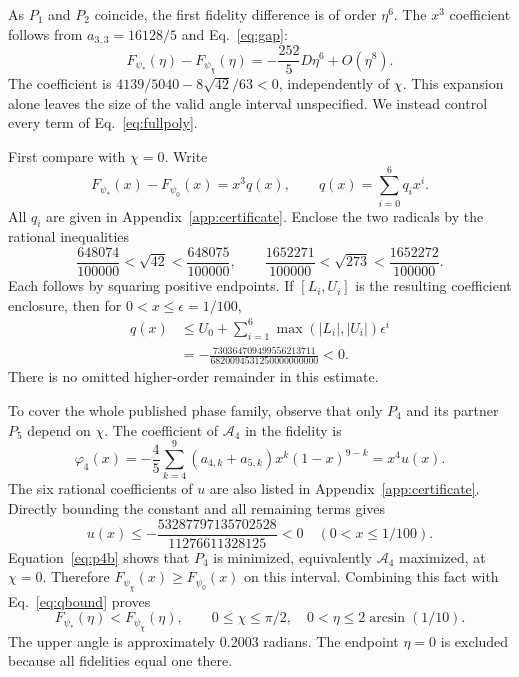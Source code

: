 \documentclass[aps,pra,reprint,onecolumn,notitlepage,longbibliography]{revtex4-2}
\newcommand{\A}{\mathcal A}
\begin{document}
As $P_1$ and $P_2$ coincide, the first fidelity difference is of order $\eta^6$. The $x^3$ coefficient follows from $a_{3,3}=16128/5$ and Eq.~\eqref{eq:gap}:
\begin{equation}
 F_{\psi_*}(\eta)-F_{\psi_\chi}(\eta)
   =-\frac{252}{5}D\eta^6+O(\eta^8).
 \label{eq:leading}
\end{equation}
The coefficient is $4139/5040-8\sqrt{42}/63<0$, independently of $\chi$. This expansion alone leaves the size of the valid angle interval unspecified. We instead control every term of Eq.~\eqref{eq:fullpoly}.

First compare with $\chi=0$. Write
\begin{equation}
 F_{\psi_*}(x)-F_{\psi_0}(x)=x^3q(x),\qquad
 q(x)=\sum_{i=0}^6q_ix^i.
 \label{eq:q}
\end{equation}
All $q_i$ are given in Appendix~\ref{app:certificate}. Enclose the two radicals by the rational inequalities
\begin{equation}
 \frac{648074}{100000}<\sqrt{42}<\frac{648075}{100000},\qquad
 \frac{1652271}{100000}<\sqrt{273}<\frac{1652272}{100000}.
 \label{eq:radicals}
\end{equation}
Each follows by squaring positive endpoints. If $[L_i,U_i]$ is the resulting coefficient enclosure, then for $0<x\leq\epsilon=1/100$,
\begin{align}
 q(x)&\leq U_0+\sum_{i=1}^6\max(|L_i|,|U_i|)\epsilon^i\\
 &= -\frac{730364709499556213711}{6820094531250000000000}<0.
 \label{eq:qbound}
\end{align}
There is no omitted higher-order remainder in this estimate.

To cover the whole published phase family, observe that only $P_4$ and its partner $P_5$ depend on $\chi$. The coefficient of $\A_4$ in the fidelity is
\begin{equation}
 \varphi_4(x)=-\frac45\sum_{k=4}^9(a_{4,k}+a_{5,k})x^k(1-x)^{9-k}
              =x^4u(x).
 \label{eq:phi4}
\end{equation}
The six rational coefficients of $u$ are also listed in Appendix~\ref{app:certificate}. Directly bounding the constant and all remaining terms gives
\begin{equation}
 u(x)\leq-\frac{53287797135702528}{11276611328125}<0
 \quad(0<x\leq1/100).
 \label{eq:ubound}
\end{equation}
Equation~\eqref{eq:p4b} shows that $P_4$ is minimized, equivalently $\A_4$ maximized, at $\chi=0$. Therefore $F_{\psi_\chi}(x)\geq F_{\psi_0}(x)$ on this interval. Combining this fact with Eq.~\eqref{eq:qbound} proves
\begin{equation}
 F_{\psi_*}(\eta)<F_{\psi_\chi}(\eta),\qquad
 0\leq\chi\leq\pi/2,\quad
 0<\eta\leq2\arcsin(1/10).
 \label{eq:comparison}
\end{equation}
The upper angle is approximately $0.2003$ radians. The endpoint $\eta=0$ is excluded because all fidelities equal one there.
\end{document}
